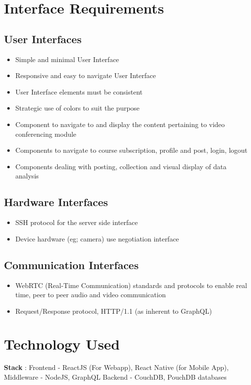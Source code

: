 \section{Interface Requirements}

\subsection{User Interfaces}
\begin{itemize}
    \item Simple and minimal User Interface
    \item Responsive and easy to navigate User Interface
    \item User Interface elements must be consistent
    \item Strategic use of colors to suit the purpose
    \item Component to navigate to and display the content pertaining to video conferencing module
    \item Components to navigate to course subscription, profile and post, login, logout
    \item Components dealing with posting, collection and visual display of data analysis
\end{itemize}

\subsection{Hardware Interfaces}
\begin{itemize}
    \item SSH protocol for the server side interface
    \item Device hardware (eg; camera) use negotiation interface
\end{itemize}

\subsection{Communication Interfaces}
\begin{itemize}
    \item WebRTC (Real-Time Communication) standards and protocols to enable real time, peer to peer audio and video communication
    \item Request/Response protocol, HTTP/1.1 (as inherent to GraphQL)
\end{itemize}

\section{Technology Used}
\textbf{Stack} :  Frontend - ReactJS (For Webapp), React Native (for Mobile App), 
Middleware - NodeJS, GraphQL
Backend - CouchDB, PouchDB databases 


